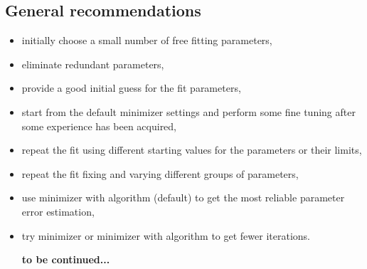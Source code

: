 \subsection*{General recommendations}
\begin{itemize}
\item initially choose  a small number of free fitting parameters,
\item eliminate redundant parameters,
\item provide a good initial guess for the fit parameters,
\item start from the default minimizer settings and perform some fine tuning after some experience has been acquired,
\item repeat the fit using different starting values for the parameters or their limits,
\item repeat the fit fixing and varying different groups of parameters,
\item use  minimizer with  algorithm
  (default) to get the most reliable parameter error estimation,
\item try  minimizer or  minimizer with  algorithm to get fewer iterations.




{\bf to be continued... }


\end{itemize}

